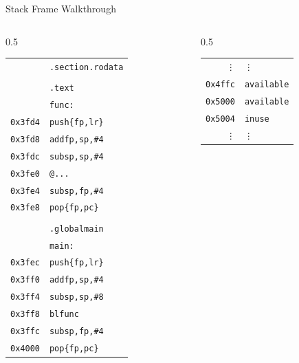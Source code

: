 \begin{frame}{Stack Frame Walkthrough}
	\small
	\begin{columns}
		\begin{column}{0.5\textwidth}
			\begin{alltt}
				\begin{tabular}{r | l}
					       & {\quad}.section .rodata \\
					       &                         \\
					       & {\quad}.text            \\
					       & func:                   \\
					0x3fd4 & {\quad}push \{fp, lr\}  \\
					0x3fd8 & {\quad}add fp, sp, \#4  \\
					0x3fdc & {\quad}sub sp, sp, \#4  \\
					0x3fe0 & {\quad}@ ...            \\
					0x3fe4 & {\quad}sub sp, fp, \#4  \\
					0x3fe8 & {\quad}pop \{fp, pc\}   \\
					       &                         \\
					       & {\quad}.global main     \\
					       & main:                   \\
					0x3fec & {\quad}push \{fp, lr\}  \\
					0x3ff0 & {\quad}add fp, sp, \#4  \\
					0x3ff4 & {\quad}sub sp, sp, \#8  \\
					0x3ff8 & {\quad}bl func          \\
					0x3ffc & {\quad}sub sp, fp, \#4  \\
					0x4000 & {\quad}pop \{fp, pc\}   \\
				\end{tabular}
			\end{alltt}
		\end{column}
		\begin{column}{0.5\textwidth}
			\begin{alltt}
				\begin{tabular}{ r | l}
					\vdots & \vdots    \\
					0x4ffc & available \\
					0x5000 & available \\
					0x5004 & in use    \\
					\vdots & \vdots    \\
				\end{tabular}
			\end{alltt}


\end{column}
\end{columns}
\end{frame}
